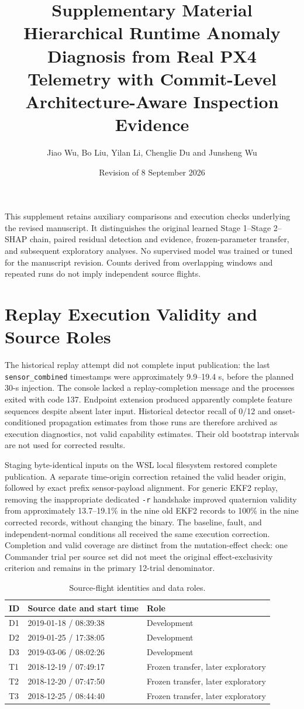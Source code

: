 \documentclass[10pt,a4paper]{article}
\title{Supplementary Material\\\large Hierarchical Runtime Anomaly Diagnosis from Real PX4 Telemetry with Commit-Level Architecture-Aware Inspection Evidence}
\author{Jiao Wu, Bo Liu, Yilan Li, Chenglie Du and Junsheng Wu}
\date{Revision of 8 September 2026}
\begin{document}
\maketitle
This supplement retains auxiliary comparisons and execution checks underlying the revised manuscript. It distinguishes the original learned Stage 1--Stage 2--SHAP chain, paired residual detection and evidence, frozen-parameter transfer, and subsequent exploratory analyses. No supervised model was trained or tuned for the manuscript revision. Counts derived from overlapping windows and repeated runs do not imply independent source flights.

\section{Replay Execution Validity and Source Roles}

The historical replay attempt did not complete input publication: the last \texttt{sensor\_combined} timestamps were approximately 9.9--19.4 s, before the planned 30-s injection. The console lacked a replay-completion message and the processes exited with code 137. Endpoint extension produced apparently complete feature sequences despite absent later input. Historical detector recall of 0/12 and onset-conditioned propagation estimates from those runs are therefore archived as execution diagnostics, not valid capability estimates. Their old bootstrap intervals are not used for corrected results.

Staging byte-identical inputs on the WSL local filesystem restored complete publication. A separate time-origin correction retained the valid header origin, followed by exact prefix sensor-payload alignment. For generic EKF2 replay, removing the inappropriate dedicated \texttt{-r} handshake improved quaternion validity from approximately 13.7--19.1\% in the nine old EKF2 records to 100\% in the nine corrected records, without changing the binary. The baseline, fault, and independent-normal conditions all received the same execution correction. Completion and valid coverage are distinct from the mutation-effect check: one Commander trial per source set did not meet the original effect-exclusivity criterion and remains in the primary 12-trial denominator.

\begin{table}[htbp]
\centering\small
\caption{Source-flight identities and data roles.}
\begin{tabular}{lll}
\toprule ID & Source date and start time & Role\\\midrule
D1 & 2019-01-18 / 08:39:38 & Development\\
D2 & 2019-01-25 / 17:38:05 & Development\\
D3 & 2019-03-06 / 08:02:26 & Development\\
T1 & 2018-12-19 / 07:49:17 & Frozen transfer, later exploratory\\
T2 & 2018-12-20 / 07:47:50 & Frozen transfer, later exploratory\\
T3 & 2018-12-25 / 08:44:40 & Frozen transfer, later exploratory\\
\bottomrule
\end{tabular}
\end{table}
\end{document}
